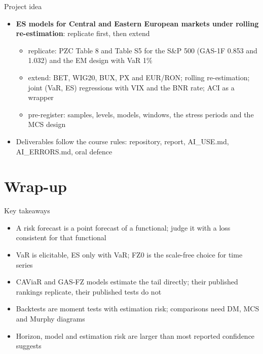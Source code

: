 \begin{frame}{Project idea}
\itemsize{\small}
\begin{itemize}
    \item \textbf{ES models for Central and Eastern European markets under rolling re-estimation}: replicate first, then extend
    \begin{itemize}
        \item replicate: PZC Table 8 and Table S5 for the S\&P 500 (GAS-1F 0.853 and 1.032) and the EM design with VaR 1\%
        \item extend: BET, WIG20, BUX, PX and EUR/RON; rolling re-estimation; joint (VaR, ES) regressions with VIX and the BNR rate; ACI as a wrapper
        \item pre-register: samples, levels, models, windows, the stress periods and the MCS design
    \end{itemize}
    \item Deliverables follow the course rules: repository, report, AI\_USE.md, AI\_ERRORS.md, oral defence
\end{itemize}
\end{frame}


\section{Wrap-up}

\begin{frame}{Key takeaways}
\itemsize{\small}
\begin{itemize}
    \item A risk forecast is a point forecast of a functional; judge it with a loss consistent for that functional
    \item VaR is elicitable, ES only with VaR; FZ0 is the scale-free choice for time series
    \item CAViaR and GAS-FZ models estimate the tail directly; their published rankings replicate, their published tests do not
    \item Backtests are moment tests with estimation risk; comparisons need DM, MCS and Murphy diagrams
    \item Horizon, model and estimation risk are larger than most reported confidence suggests
\end{itemize}
\end{frame}

